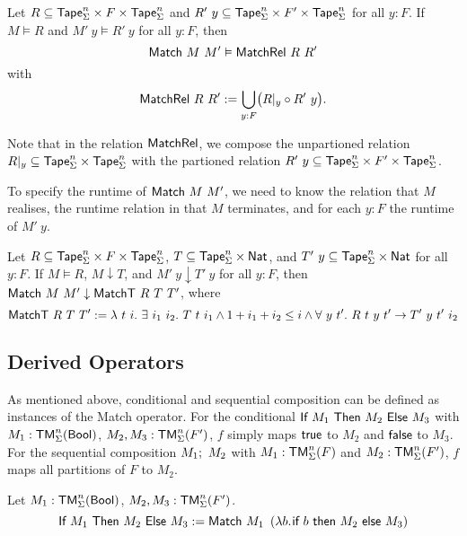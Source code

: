 \begin{lemma}
  \label{lem:Match_Realise}
  Let $R \subseteq \textsf{Tape}_\Sigma^n \times F \times \textsf{Tape}_\Sigma^n$ and $R'~y \subseteq \textsf{Tape}_\Sigma^n \times F' \times \textsf{Tape}_\Sigma^n$ for all $y:F$.
  If $M \vDash R$ and $M'~y \vDash R'~y$ for all $y:F$, then
  \[
    \textsf{Match}~M~M' \vDash \textsf{MatchRel}~R~R'
  \]
  with
  \[
    \textsf{MatchRel}~R~R' := \bigcup_{y:F} \bigl( R{|}_{y} \circ R'~y \bigr).
  \]
\end{lemma}

Note that in the relation $\textsf{MatchRel}$, we compose the unpartioned relation $R {|}_{y} \subseteq \textsf{Tape}_\Sigma^n \times \textsf{Tape}_\Sigma^n$ with the partioned
relation $R'~y \subseteq \textsf{Tape}_\Sigma^n \times F' \times \textsf{Tape}_\Sigma^n$.

To specify the runtime of $\textsf{Match}~M~M'$, we need to know the relation that $M$ realises, the runtime relation in that $M$ terminates, and for each
$y:F$ the runtime of $M'~y$.

\begin{lemma}
  \label{lem:Match_Terminates}
  Let $R \subseteq \textsf{Tape}_\Sigma^n \times F \times \textsf{Tape}_\Sigma^n$, $T \subseteq \textsf{Tape}_\Sigma^n \times \textsf{Nat}$, and
  $T'~y \subseteq \textsf{Tape}_\Sigma^n \times \textsf{Nat}$ for all $y:F$.  If $M \vDash R$, $M \downarrow T$, and $M'~y \downarrow T'~y$ for all $y:F$, then
  $\textsf{Match}~M~M' \downarrow \textsf{MatchT}~R~T~T'$, where
  \[
    \textsf{MatchT}~R~T~T' :=
    \lambda~t~i.~ \exists~i_1~i_2.~T~t~i_1 \land 1+i_1+i_2 \le i \land
      \forall~y~t'.~ R~t~y~t' \rightarrow T'~y~t'~i_2
  \]
\end{lemma}


\subsection{Derived Operators}
\label{sec:match-derived-operators}

As mentioned above, conditional and sequential composition can be defined as instances of the Match operator.  For the conditional
$\textsf{If}~M_1~\textsf{Then}~M_2~\textsf{Else}~M_3$ with $M_1 : \textsf{TM}_\Sigma^n(\textsf{Bool})$, $M_2, M_3 : \textsf{TM}_\Sigma^n(F')$, $f$ simply maps $\textsf{true}$ to $M_2$ and $\textsf{false}$ to $M_3$.  For the
sequential composition $M_1 ;~ M_2$ with $M_1 : \textsf{TM}_\Sigma^n(F)$ and $M_2 : \textsf{TM}_\Sigma^n(F')$, $f$ maps all partitions of $F$ to $M_2$.

\begin{definition}[Conditional]
  \label{def:If}
  Let $M_1 : \textsf{TM}_\Sigma^n(\textsf{Bool})$, $M_2, M_3 : \textsf{TM}_\Sigma^n(F')$.
  \[
    \textsf{If}~M_1~\textsf{Then}~M_2~\textsf{Else}~M_3 := \textsf{Match}~M_1~
    \left(\lambda b{.}\hskip.7pt\textsf{if}~b~\textsf{then}~M_2~\textsf{else}~M_3 \right)
  \]
\end{definition}

